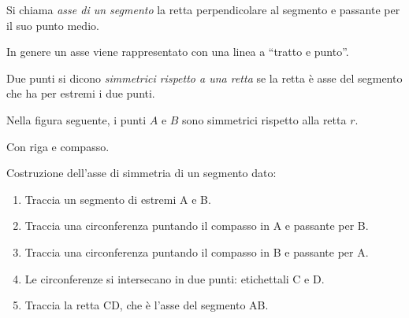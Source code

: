 \begin{definizione}\label{def:asse_segmento}
Si chiama \emph{asse di un segmento} la retta perpendicolare al 
segmento e passante per il suo punto medio.
\end{definizione}

In genere un asse viene rappresentato con una linea a ``tratto e punto''.

\begin{definizione}
Due punti si dicono \emph{simmetrici rispetto a una retta} se la 
retta è asse del segmento che ha per estremi i due punti.
\end{definizione}

Nella figura seguente, i punti \(A\) e \(B\) sono simmetrici 
rispetto alla retta \(r\).

\begin{minipage}{.49\textwidth}
 \begin{inaccessibleblock}
\begin{center}\end{center}
\end{inaccessibleblock}
\end{minipage}
\begin{minipage}{.49\textwidth}
 \begin{inaccessibleblock}
\begin{center}\end{center}
\end{inaccessibleblock}
\end{minipage}

\newpage %

Con riga e compasso.

\begin{procedura}\label{proc:fonda_asse}
  Costruzione dell'asse di simmetria di un segmento dato:
  \begin{enumerate} [nosep]
    \item 
    Traccia un segmento di estremi A e B.
    \item 
    Traccia una circonferenza puntando il compasso in A e passante per B.
    \item 
    Traccia una circonferenza puntando il compasso in B e passante per A.  
    \item 
    Le circonferenze si intersecano in due punti: etichettali C e D.
    \item 
    Traccia la retta CD, che è l'asse del segmento AB.
  \end{enumerate}
\end{procedura}

